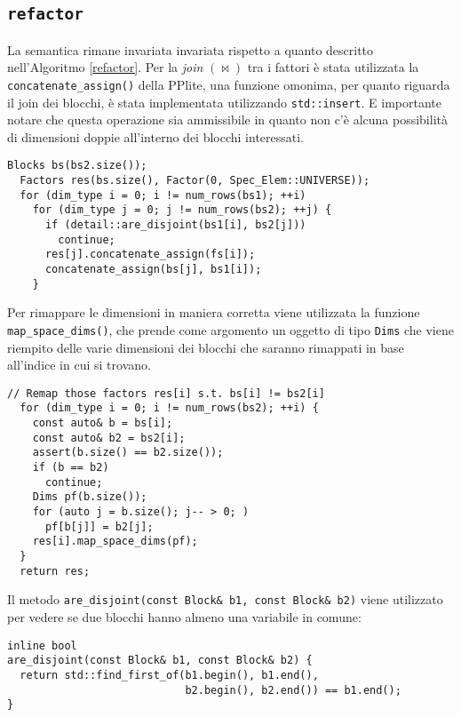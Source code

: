 \documentclass{mimosis}
\theoremstyle{definition}
\begin{document}
\subsection{\texttt{refactor}}
\label{sec:orgeceaa0e}
La semantica rimane invariata invariata rispetto a quanto descritto
nell'Algoritmo \ref{refactor}. Per la \emph{join} \((\bowtie)\) tra i fattori è stata
utilizzata la \texttt{concatenate\_assign()} della PPlite, una funzione omonima, per
quanto riguarda il join dei blocchi, è stata implementata utilizzando
\texttt{std::insert}. E importante notare che questa operazione sia
ammissibile in quanto non c'è alcuna possibilità di dimensioni doppie
all'interno dei blocchi interessati.

\lstset{style=mystyle,language=C++,label= ,caption= ,captionpos=b,numbers=none}
\begin{lstlisting}
Blocks bs(bs2.size());
  Factors res(bs.size(), Factor(0, Spec_Elem::UNIVERSE));
  for (dim_type i = 0; i != num_rows(bs1); ++i)
    for (dim_type j = 0; j != num_rows(bs2); ++j) {
      if (detail::are_disjoint(bs1[i], bs2[j]))
        continue;
      res[j].concatenate_assign(fs[i]);
      concatenate_assign(bs[j], bs1[i]);
    }
\end{lstlisting}

Per rimappare le dimensioni in maniera corretta viene utilizzata la funzione
\texttt{map\_space\_dims()}, che prende come argomento un oggetto di tipo \texttt{Dims} che
viene riempito delle varie dimensioni dei blocchi che saranno rimappati in base
all'indice in cui si trovano.

\lstset{style=mystyle,language=C++,label= ,caption= ,captionpos=b,numbers=none}
\begin{lstlisting}
// Remap those factors res[i] s.t. bs[i] != bs2[i]
  for (dim_type i = 0; i != num_rows(bs2); ++i) {
    const auto& b = bs[i];
    const auto& b2 = bs2[i];
    assert(b.size() == b2.size());
    if (b == b2)
      continue;
    Dims pf(b.size());
    for (auto j = b.size(); j-- > 0; )
      pf[b[j]] = b2[j];
    res[i].map_space_dims(pf);
  }
  return res;
\end{lstlisting}

Il metodo \texttt{are\_disjoint(const Block\& b1, const Block\& b2)} viene utilizzato per
vedere se due blocchi hanno almeno una variabile in comune:

\lstset{style=mystyle,language=C++,label= ,caption= ,captionpos=b,numbers=none}
\begin{lstlisting}
inline bool
are_disjoint(const Block& b1, const Block& b2) {
  return std::find_first_of(b1.begin(), b1.end(),
                            b2.begin(), b2.end()) == b1.end();
}
\end{lstlisting}
\end{document}
